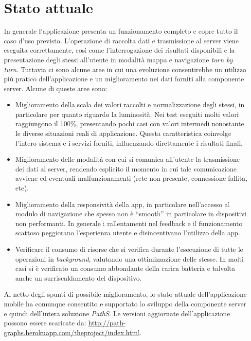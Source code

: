 \section{Stato attuale}
In generale l'applicazione presenta un funzionamento completo e copre tutto il caso d'uso previsto. L'operazione di raccolta dati e trasmissione al server viene eseguita correttamente, così come l'interrogazione dei risultati disponibili e la presentazione degli stessi all'utente in modalità mappa e navigazione \emph{turn by turn}.
Tuttavia ci sono alcune aree in cui una evoluzione consentirebbe un utilizzo più pratico dell'applicazione e un miglioramento nei dati forniti alla componente server. 
Alcune di queste aree sono:
\begin{itemize}
\item Miglioramento della scala dei valori raccolti e normalizzazione degli stessi, in particolare per quanto riguardo la luminosità. Nei test eseguiti molti valori raggiungono il 100\%, presentando pochi casi con valori intermedi nonostante le diverse situazioni reali di applicazione. Questa caratteristica coinvolge l'intero sistema e i servizi forniti, influenzando direttamente i risultati finali.
\item Miglioramento delle modalità con cui si comunica all'utente la trasmissione dei dati al server, rendendo esplicito il momento in cui tale comunicazione avviene ed eventuali malfunzionamenti (rete non presente, connessione fallita, etc).
\item Miglioramento della responsività della app, in particolare nell'accesso al modulo di navigazione che spesso non è ``smooth'' in particolare in dispositivi non performanti. In generale i rallentamenti nel feedback e il funzionamento scattoso peggiorano l'esperienza utente e disincentivano l'utilizzo della app.
\item Verificare il consumo di risorse che si verifica durante l'esecuzione di tutte le operazioni in \emph{background}, valutando una ottimizzazione delle stesse. In molti casi si è verificato un consumo abbondante della carica batteria e talvolta anche un surriscaldamento del dispositivo.
\end{itemize}
Al netto degli spunti di possibile miglioramento, lo stato attuale dell'applicazione mobile ha comunque consentito e supportato lo sviluppo della componente server e quindi dell'intera soluzione \emph{PathS}. Le versioni aggiornate dell'applicazione possono essere scaricate da: \url{http://path-graphs.herokuapp.com/theproject/index.html}.
